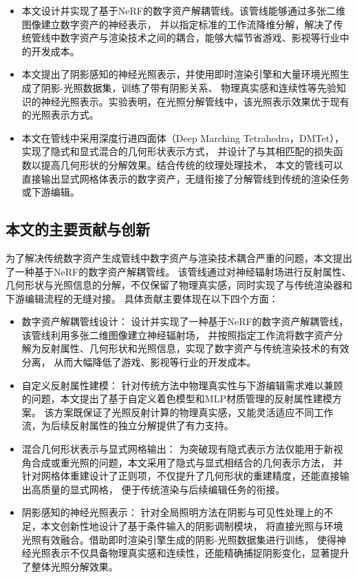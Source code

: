 \begin{itemize}
  \item 本文设计并实现了基于NeRF的数字资产解耦管线。该管线能够通过多张二维图像建立数字资产的神经表示，
  并以指定标准的工作流降维分解，解决了传统管线中数字资产与渲染技术之间的耦合，能够大幅节省游戏、影视等行业中的开发成本。
  \item 本文提出了阴影感知的神经光照表示，并使用即时渲染引擎和大量环境光照生成了阴影-光照数据集，训练了带有阴影关系、
  物理真实感和连续性等先验知识的神经光照表示。实验表明，在光照分解管线中，该光照表示效果优于现有的光照表示方式。
  \item 本文在管线中采用深度行进四面体（Deep Marching Tetrahedra，DMTet），实现了隐式和显式混合的几何形状表示方式，
  并设计了与其相匹配的损失函数以提高几何形状的分解效果。结合传统的纹理处理技术，
  本文的管线可以直接输出显式网格体表示的数字资产，无缝衔接了分解管线到传统的渲染任务或下游编辑。
\end{itemize}

\subsection{本文的主要贡献与创新}

为了解决传统数字资产生成管线中数字资产与渲染技术耦合严重的问题，本文提出了一种基于NeRF的数字资产解耦管线。
该管线通过对神经辐射场进行反射属性、几何形状与光照信息的分解，不仅保留了物理真实感，同时实现了与传统渲染器和下游编辑流程的无缝对接。
具体贡献主要体现在以下四个方面：

\begin{itemize}
  \item 数字资产解耦管线设计：
    设计并实现了一种基于NeRF的数字资产解耦管线，该管线利用多张二维图像建立神经辐射场，
    并按照指定工作流将数字资产分解为反射属性、几何形状和光照信息，实现了数字资产与传统渲染技术的有效分离，
    从而大幅降低了游戏、影视等行业的开发成本。

  \item 自定义反射属性建模：
    针对传统方法中物理真实性与下游编辑需求难以兼顾的问题，本文提出了基于自定义着色模型和MLP材质管理的反射属性建模方案。
    该方案既保证了光照反射计算的物理真实感，又能灵活适应不同工作流，为后续反射属性的独立分解提供了有力支持。

  \item 混合几何形状表示与显式网格输出：
    为突破现有隐式表示方法仅能用于新视角合成或重光照的问题，本文采用了隐式与显式相结合的几何表示方法，
    并针对网格体重建设计了正则项，不仅提升了几何形状的重建精度，还能直接输出高质量的显式网格，
    便于传统渲染与后续编辑任务的衔接。

  \item 阴影感知的神经光照表示：
    针对全局照明方法在阴影与可见性处理上的不足，本文创新性地设计了基于条件输入的阴影调制模块，
    将直接光照与环境光照有效融合。借助即时渲染引擎生成的阴影-光照数据集进行训练，
    使得神经光照表示不仅具备物理真实感和连续性，还能精确捕捉阴影变化，显著提升了整体光照分解效果。

\end{itemize}

